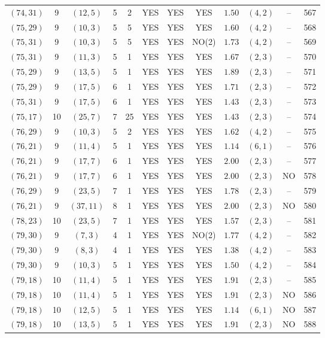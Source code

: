 \begin{longtable}{|c|c|c|c|c|c|c|c|c|c|c|c|}
$(74,31)$ & 9 & $(12,5)$ & 5 & 2 & YES & YES & YES & $1.50$ & $(4,2)$ & -- & 567\\
$(75,29)$ & 9 & $(10,3)$ & 5 & 5 & YES & YES & YES & $1.60$ & $(4,2)$ & -- & 568\\
$(75,31)$ & 9 & $(10,3)$ & 5 & 5 & YES & YES & NO(2) & $1.73$ & $(4,2)$ & -- & 569\\
$(75,31)$ & 9 & $(11,3)$ & 5 & 1 & YES & YES & YES & $1.67$ & $(2,3)$ & -- & 570\\
$(75,29)$ & 9 & $(13,5)$ & 5 & 1 & YES & YES & YES & $1.89$ & $(2,3)$ & -- & 571\\
$(75,29)$ & 9 & $(17,5)$ & 6 & 1 & YES & YES & YES & $1.71$ & $(2,3)$ & -- & 572\\
$(75,31)$ & 9 & $(17,5)$ & 6 & 1 & YES & YES & YES & $1.43$ & $(2,3)$ & -- & 573\\
$(75,17)$ & 10 & $(25,7)$ & 7 & 25 & YES & YES & YES & $1.43$ & $(2,3)$ & -- & 574\\
$(76,29)$ & 9 & $(10,3)$ & 5 & 2 & YES & YES & YES & $1.62$ & $(4,2)$ & -- & 575\\
$(76,21)$ & 9 & $(11,4)$ & 5 & 1 & YES & YES & YES & $1.14$ & $(6,1)$ & -- & 576\\
$(76,21)$ & 9 & $(17,7)$ & 6 & 1 & YES & YES & YES & $2.00$ & $(2,3)$ & -- & 577\\
$(76,21)$ & 9 & $(17,7)$ & 6 & 1 & YES & YES & YES & $2.00$ & $(2,3)$ & NO & 578\\
$(76,29)$ & 9 & $(23,5)$ & 7 & 1 & YES & YES & YES & $1.78$ & $(2,3)$ & -- & 579\\
$(76,21)$ & 9 & $(37,11)$ & 8 & 1 & YES & YES & YES & $2.00$ & $(2,3)$ & NO & 580\\
$(78,23)$ & 10 & $(23,5)$ & 7 & 1 & YES & YES & YES & $1.57$ & $(2,3)$ & -- & 581\\
$(79,30)$ & 9 & $(7,3)$ & 4 & 1 & YES & YES & NO(2) & $1.77$ & $(4,2)$ & -- & 582\\
$(79,30)$ & 9 & $(8,3)$ & 4 & 1 & YES & YES & YES & $1.38$ & $(4,2)$ & -- & 583\\
$(79,30)$ & 9 & $(10,3)$ & 5 & 1 & YES & YES & YES & $1.50$ & $(4,2)$ & -- & 584\\
$(79,18)$ & 10 & $(11,4)$ & 5 & 1 & YES & YES & YES & $1.91$ & $(2,3)$ & -- & 585\\
$(79,18)$ & 10 & $(11,4)$ & 5 & 1 & YES & YES & YES & $1.91$ & $(2,3)$ & NO & 586\\
$(79,18)$ & 10 & $(12,5)$ & 5 & 1 & YES & YES & YES & $1.14$ & $(6,1)$ & NO & 587\\
$(79,18)$ & 10 & $(13,5)$ & 5 & 1 & YES & YES & YES & $1.91$ & $(2,3)$ & NO & 588\\

\end{longtable}
